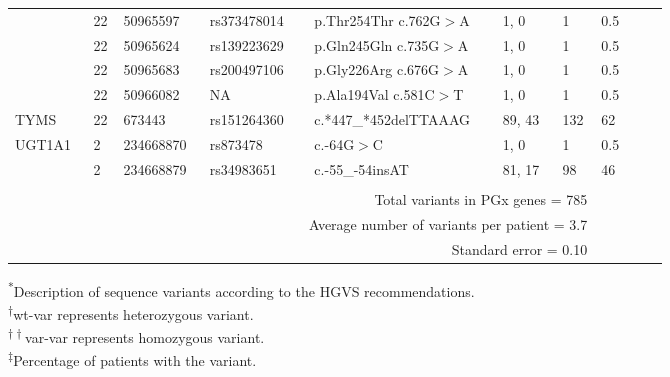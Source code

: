\begin{longtable}{p{0.09\linewidth}|p{0.02\linewidth}p{0.1\linewidth}p{0.14\linewidth}p{0.2\linewidth}p{0.08\linewidth}p{0.04\linewidth}p{0.09\linewidth}}
		\\
		& 22 & 50965597 & rs373478014 & p.Thr254Thr c.762G$>$A & 1, 0 & 1 & 0.5
		\\
		& 22 & 50965624 & rs139223629 & p.Gln245Gln c.735G$>$A & 1, 0 & 1 & 0.5
		\\
		& 22 & 50965683 & rs200497106 & p.Gly226Arg c.676G$>$A & 1, 0 & 1 & 0.5
		\\
		& 22 & 50966082 & NA & p.Ala194Val c.581C$>$T & 1, 0 & 1 & 0.5
		\\
		\hline
		TYMS & 22 & 673443 & rs151264360 & \footnotesize{c.*447\_*452delTTAAAG} & 89, 43 & 132 & 62
		\\
		\hline
		UGT1A1 & 2 & 234668870 & rs873478 & c.-64G$>$C & 1, 0 & 1 & 0.5
		\\
		& 2 & 234668879 & rs34983651 & c.-55\_-54insAT & 81, 17 & 98 & 46
		\\
		\hline
		\\
		&
		\multicolumn{6}{r}{Total variants in PGx genes = 785}
		\\
		&
		\multicolumn{6}{r}{Average number of variants per patient = 3.7}
		\\
		&
		\multicolumn{6}{r}{Standard error = 0.10}
		\\
		\hline
\end{longtable}
\noindent\textsuperscript{*}Description of sequence variants according to the HGVS recommendations.
\\
\textsuperscript{$\dagger$}wt-var represents heterozygous variant.
\\
\textsuperscript{$\dagger\dagger$}var-var represents homozygous variant.
\\\textsuperscript{$\ddagger$}Percentage of patients with the variant.



